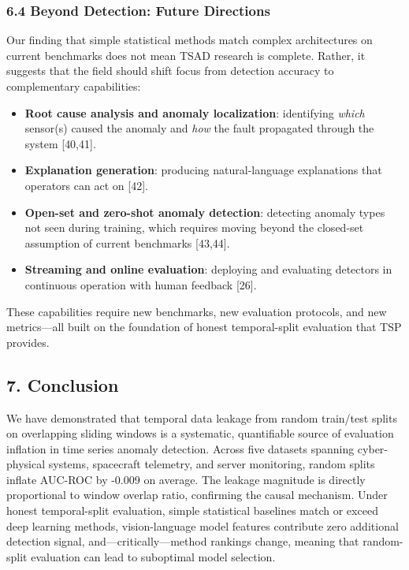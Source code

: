 \documentclass[
]{article}
\providecommand{\tightlist}{%
  \setlength{\itemsep}{0pt}\setlength{\parskip}{0pt}}
\begin{document}
\subsubsection{6.4 Beyond Detection: Future
Directions}\label{beyond-detection-future-directions}

Our finding that simple statistical methods match complex architectures
on current benchmarks does not mean TSAD research is complete. Rather,
it suggests that the field should shift focus from detection accuracy to
complementary capabilities:

\begin{itemize}
\tightlist
\item
  \textbf{Root cause analysis and anomaly localization}: identifying
  \emph{which} sensor(s) caused the anomaly and \emph{how} the fault
  propagated through the system {[}40,41{]}.
\item
  \textbf{Explanation generation}: producing natural-language
  explanations that operators can act on {[}42{]}.
\item
  \textbf{Open-set and zero-shot anomaly detection}: detecting anomaly
  types not seen during training, which requires moving beyond the
  closed-set assumption of current benchmarks {[}43,44{]}.
\item
  \textbf{Streaming and online evaluation}: deploying and evaluating
  detectors in continuous operation with human feedback {[}26{]}.
\end{itemize}

These capabilities require new benchmarks, new evaluation protocols, and
new metrics---all built on the foundation of honest temporal-split
evaluation that TSP provides.

\subsection{7. Conclusion}\label{conclusion}

We have demonstrated that temporal data leakage from random train/test
splits on overlapping sliding windows is a systematic, quantifiable
source of evaluation inflation in time series anomaly detection. Across
five datasets spanning cyber-physical systems, spacecraft telemetry, and
server monitoring, random splits inflate AUC-ROC by -0.009 on average.
The leakage magnitude is directly proportional to window overlap ratio,
confirming the causal mechanism. Under honest temporal-split evaluation,
simple statistical baselines match or exceed deep learning methods,
vision-language model features contribute zero additional detection
signal, and---critically---method rankings change, meaning that
random-split evaluation can lead to suboptimal model selection.
\end{document}
